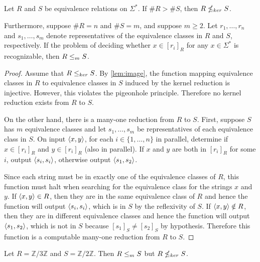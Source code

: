 \begin{proposition}\label{prop:noreduction}
  Let $R$ and $S$ be equivalence relations on $\Sigma^*$.
  If $\#R > \#S$, then $R \nleq_{ker} S$.

  Furthermore, suppose $\#R = n$ and $\#S = m$, and suppose $m \geq 2$.
  Let $r_1, \dotsc, r_n$ and $s_1, \dotsc, s_m$ denote representatives of the equivalence classes in $R$ and $S$, respectively.
  If the problem of deciding whether $x \in [r_i]_R$ for any $x \in \Sigma^*$ is recognizable, then $R \leq_m S$.
\end{proposition}
\begin{proof}
  Assume that $R \leq_{ker} S$.
  By \autoref{lem:image}, the function mapping equivalence classes in $R$ to equivalence classes in $S$ induced by the kernel reduction is injective.
  However, this violates the pigeonhole principle.
  Therefore no kernel reduction exists from $R$ to $S$.

  On the other hand, there is a many-one reduction from $R$ to $S$.
  First, suppose $S$ has $m$ equivalence classes and let $s_1, \dotsc, s_m$ be representatives of each equivalence class in $S$.
  On input $\left\langle x,y\right\rangle$, for each $i \in \{1, \dotsc, n\}$ in parallel, determine if $x \in [r_i]_R$ and $y \in [r_i]_R$ (also in parallel).
  If $x$ and $y$ are both in $[r_i]_R$ for some $i$, output $\left\langle s_i,s_i\right\rangle$, otherwise output $\left\langle s_1,s_2\right\rangle$.

  Since each string must be in exactly one of the equivalence classes of $R$, this function must halt when searching for the equivalence class for the strings $x$ and $y$.
  If $\left\langle x,y\right\rangle \in R$, then they are in the same equivalence class of $R$ and hence the function will output $\left\langle s_i,s_i\right\rangle$, which is in $S$ by the reflexivity of $S$.
  If $\left\langle x,y\right\rangle \notin R$, then they are in different equivalence classes and hence the function will output $\left\langle s_1,s_2\right\rangle$, which is not in $S$ because $[s_1]_S \neq [s_2]_S$ by hypothesis.
  Therefore this function is a computable many-one reduction from $R$ to $S$.
\end{proof}

\begin{example}
  Let $R = \mathbb{Z} / 3 \mathbb{Z}$ and $S = \mathbb{Z} / 2 \mathbb{Z}$.
  Then $R \leq_m S$ but $R \nleq_{ker} S$.
\end{example}

